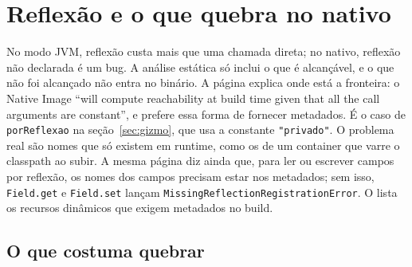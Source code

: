 \section{Reflexão e o que quebra no nativo}
\label{sec:reflexao-nativo}

No modo JVM, reflexão custa mais que uma chamada direta; no nativo,
reflexão não declarada é um bug. A análise estática só inclui o que é
alcançável, e o que não foi alcançado não entra no binário. A página
 explica onde está a fronteira: o Native
Image \enquote{will compute reachability at build time given that all
the call arguments are constant}, e prefere essa forma de fornecer
metadados. É o caso de \texttt{porReflexao} na seção~\ref{sec:gizmo},
que usa a constante \texttt{"privado"}. O problema real são nomes que
só existem em runtime, como os de um container que varre o classpath ao
subir. A mesma página diz ainda que, para ler ou escrever campos por
reflexão, os nomes dos campos precisam estar nos metadados; sem isso,
\texttt{Field.get} e \texttt{Field.set} lançam
\texttt{MissingReflectionRegistrationError}. O
 lista os recursos dinâmicos que exigem
metadados no build.

\subsection*{O que costuma quebrar}

